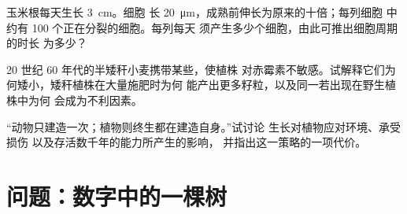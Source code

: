 \begin{exercise}[$\star\star\star$]\label{exo:b2:plant-meristems:10}
玉米根每天生长 \qty{3}{cm}。细胞
长 \qty{20}{\micro m}，成熟前伸长为原来的十倍；每列细胞
中约有 \num{100} 个正在分裂的细胞。每列每天
须产生多少个细胞，由此可推出细胞周期的时长
为多少？
\end{exercise}

\begin{exercise}[$\star\star\star$]\label{exo:b2:plant-meristems:11}
20 世纪 60 年代的半矮秆小麦携带某些，使植株
对赤霉素不敏感。试解释它们为何矮小，矮秆植株在大量施肥时为何
能产出更多籽粒，以及同一若出现在野生植株中为何
会成为不利因素。
\end{exercise}

\begin{exercise}[$\star\star\star$]\label{exo:b2:plant-meristems:12}
“动物只建造一次；植物则终生都在建造自身。”试讨论
生长对植物应对环境、承受损伤
以及存活数千年的能力所产生的影响，
并指出这一策略的一项代价。
\end{exercise}

\section{问题：数字中的一棵树}

